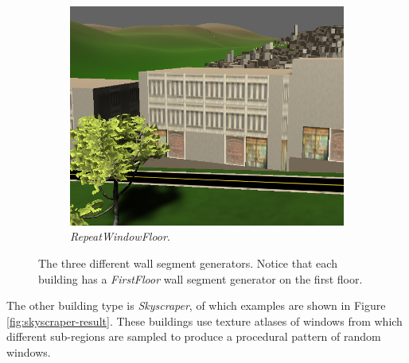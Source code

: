 \begin{figure}[H]
\begin{subfigure}[b]{0.3\textwidth}
      \includegraphics[width=\textwidth]{figure/building-only-window.PNG}
      \caption{\textit{RepeatWindowFloor}.}
  \end{subfigure}
  
  \caption{The three different wall segment generators. Notice that each building has a \textit{FirstFloor} wall segment generator on the first floor.}
  \label{fig:wall-segment-generator}
\end{figure}

The other building type is \textit{Skyscraper}, of which examples are shown in Figure \ref{fig:skyscraper-result}.
These buildings use texture atlases of windows from which different sub-regions are sampled to produce a procedural pattern of random windows.


